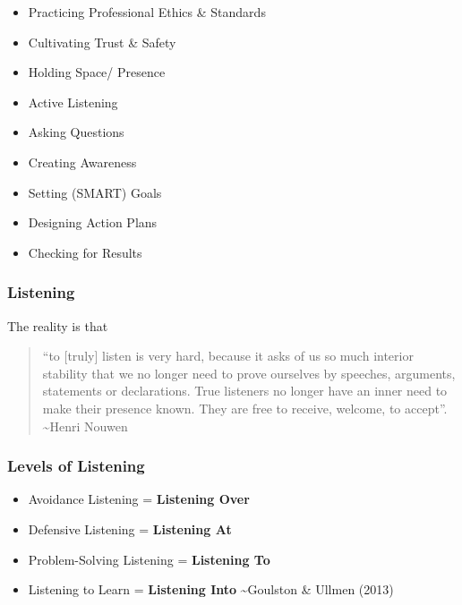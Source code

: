 \documentclass[
]{book}
\providecommand{\tightlist}{%
  \setlength{\itemsep}{0pt}\setlength{\parskip}{0pt}}
\begin{document}
\begin{itemize}
\tightlist
\item
  Practicing Professional Ethics \& Standards
\item
  Cultivating Trust \& Safety
\item
  Holding Space/ Presence
\item
  Active Listening
\item
  Asking Questions
\item
  Creating Awareness
\item
  Setting (SMART) Goals
\item
  Designing Action Plans
\item
  Checking for Results
\end{itemize}

\hypertarget{listening}{%
\subsubsection*{Listening}\label{listening}}

The reality is that

\begin{quote}
``to {[}truly{]} listen is very hard, because it asks of us so much interior stability that we no longer need to prove ourselves by speeches, arguments, statements or declarations. True listeners no longer have an inner need to make their presence known. They are free to receive, welcome, to accept''.
\textasciitilde Henri Nouwen
\end{quote}

\hypertarget{levels-of-listening}{%
\subsubsection*{Levels of Listening}\label{levels-of-listening}}

\begin{itemize}
\tightlist
\item
  Avoidance Listening = \textbf{Listening Over}
\item
  Defensive Listening = \textbf{Listening At}
\item
  Problem-Solving Listening = \textbf{Listening To}
\item
  Listening to Learn = \textbf{Listening Into}
  \textasciitilde Goulston \& Ullmen (2013)
\end{itemize}
\end{document}
